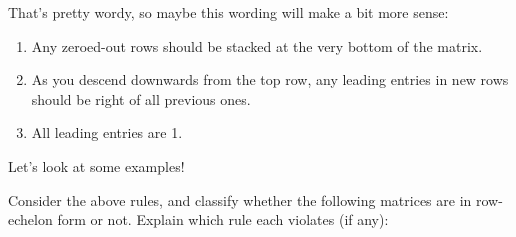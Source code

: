 \documentclass[11pt]{exam}
\begin{document}
        That's pretty wordy, so maybe this wording will make a bit more sense:
        \begin{enumerate}
            \item Any zeroed-out rows should be stacked at the very bottom of the matrix.
            \item As you descend downwards from the top row, any leading entries in new rows should be right of all previous ones.
            \item All leading entries are 1.
        \end{enumerate}
        Let's look at some examples!

        \pagebreak
        \begin{questions}
            \item Consider the above rules, and classify whether the following matrices are in row-echelon form or not.
            Explain which rule each violates (if any):
\end{questions}
\end{document}
